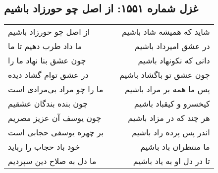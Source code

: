 \begin{center}
\section*{غزل شماره ۱۵۵۱: از اصل چو حورزاد باشیم}
\label{sec:1551}
\begin{longtable}{l p{0.5cm} r}
از اصل چو حورزاد باشیم
&&
شاید که همیشه شاد باشیم
\\
ما داد طرب دهیم تا ما
&&
در عشق امیرداد باشیم
\\
چون عشق بنا نهاد ما را
&&
دانی که نکونهاد باشیم
\\
در عشق توام گشاد دیده
&&
چون عشق تو باگشاد باشیم
\\
ما را چو مراد بی‌مرادی است
&&
پس ما همه بر مراد باشیم
\\
چون بنده بندگان عشقیم
&&
کیخسرو و کیقباد باشیم
\\
چون یوسف آن عزیز مصریم
&&
هر چند که در مزاد باشیم
\\
بر چهره یوسفی حجابی است
&&
اندر پس پرده راد باشیم
\\
خود باد حجاب را رباید
&&
ما منتظران باد باشیم
\\
ما دل به صلاح دین سپردیم
&&
تا در دل او به یاد باشیم
\\
\end{longtable}
\end{center}
